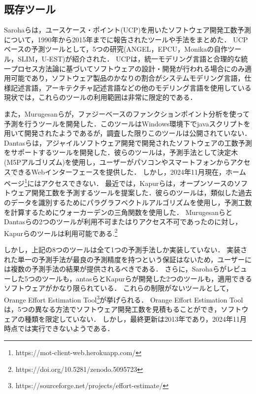 \subsection{既存ツール}\label{既存ツール}
Sarohaら\cite{Saroha2015}は，ユースケース・ポイント(UCP)を用いたソフトウェア開発工数予測について，1990年から2015年までに報告されたツールや手法をまとめた．
UCPベースの予測ツールとして，5つの研究(ANGEL\cite{Shepperd1997}，EPCU\cite{Silva2008}，Monikaの自作ツール\cite{Monika2014}，SLIM\cite{Borade2013}，U-EST\cite{Kusumoto2004})が紹介された．
UCPは，統一モデリング言語と合理的な統一プロセス方法論に基づいてソフトウェアの設計・開発が行われる場合にのみ適用可能であり，ソフトウェア製品のかなりの割合がシステムモデリング言語，仕様記述言語，アーキテクチャ記述言語などの他のモデリング言語を使用している現状では，これらのツールの利用範囲は非常に限定的である．

また，Murugesanら\cite{Murugesan2015}が，ファジーベースのファンクションポイント分析を使って予測を行うツールを開発した．このツールはWindows環境下でjavaスクリプトを用いて開発されたようであるが，調査した限りこのツールは公開されていない．
Dantasら\cite{Dantas2019}は，アジャイルソフトウェア開発で開発されたソフトウェアの工数予測をサポートするツールを開発した．彼らのツールは，予測手法として決定木(M5Pアルゴリズム)を使用し，ユーザーがパソコンやスマートフォンからアクセスできるWebインターフェースを提供した．
しかし，2024年11月現在，ホームページ\footnote{https://mot-client-web.herokuapp.com/}にはアクセスできない．
最近では，Kapurら\cite{Kapur2022}は，オープンソースのソフトウェア開発工数を予測するツールを提案した．彼らのツールは，類似した過去のデータを識別するためにパラグラフベクトルアルゴリズムを使用し，予測工数を計算するためにウォーカーデンの三角関数を使用した．
Murugesanら\cite{Murugesan2015}とDantasら\cite{Dantas2019}の2つのツールが利用不可またはりアクセス不可であったのに対し，Kapurら\cite{Kapur2022}のツールは利用可能である.\footnote{https://doi.org/10.5281/zenodo.5095723}

しかし，上記の8つのツールは全て1つの予測手法しか実装していない．
実装された単一の予測手法が最良の予測精度を持つという保証はないため，ユーザーには複数の予測手法の結果が提供されるべきである．
さらに，Sarohaら\cite{Saroha2015}がレビューした5つのツールも，antasら\cite{Dantas2019}とKapurら\cite{Kapur2022}が開発した2つのツールも，適用できるソフトウェアがかなり限られている．
これらの制限がないツールとして，Orange Effort Estimation Tool\footnote{https://sourceforge.net/projects/effort-estimate/}が挙げられる．
Orange Effort Estimation Tool\footnotemark[9]は，5つの異なる方法でソフトウェア開発工数を見積もることができ，ソフトウェアの種類を限定していない．
しかし，最終更新は2013年であり，2024年11月時点では実行できないようである．

